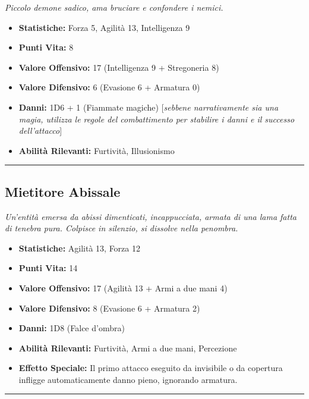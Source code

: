 \documentclass[../manuale_main.tex]{subfiles}
\begin{document}
\textit{Piccolo demone sadico, ama bruciare e confondere i nemici.}
\begin{itemize}
\item \textbf{Statistiche:} Forza 5, Agilità 13, Intelligenza 9
\item \textbf{Punti Vita:} 8
\item \textbf{Valore Offensivo:} 17 (Intelligenza 9 + Stregoneria 8)
\item \textbf{Valore Difensivo:} 6 (Evasione 6 + Armatura 0)
\item \textbf{Danni:} 1D6 + 1 (Fiammate magiche) [\textit{sebbene narrativamente sia una magia, utilizza le regole del combattimento per stabilire i danni e il successo dell'attacco}]
\item \textbf{Abilità Rilevanti:} Furtività, Illusionismo
\end{itemize}
\vspace{0.2cm}
\noindent
\begin{center}
\rule{\textwidth}{0.4pt} 
\end{center}
\clearpage
\subsection*{Mietitore Abissale}

\textit{Un’entità emersa da abissi dimenticati, incappucciata, armata di una lama fatta di tenebra pura. Colpisce in silenzio, si dissolve nella penombra.}
\begin{itemize}
\item \textbf{Statistiche:} Agilità 13, Forza 12
\item \textbf{Punti Vita:} 14
\item \textbf{Valore Offensivo:} 17 (Agilità 13 + Armi a due mani 4)
\item \textbf{Valore Difensivo:} 8 (Evasione 6 + Armatura 2)
\item \textbf{Danni:} 1D8 (Falce d’ombra)
\item \textbf{Abilità Rilevanti:} Furtività, Armi a due mani, Percezione
\item \textbf{Effetto Speciale:} Il primo attacco eseguito da invisibile o da copertura infligge automaticamente danno pieno, ignorando armatura.
\end{itemize}
\vspace{0.2cm}
\noindent
\begin{center}
\rule{\textwidth}{0.4pt} 
\end{center}
\end{document}
